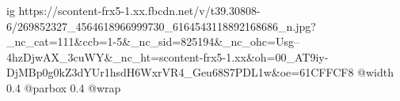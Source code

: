  
 
 
 
 

\ifcmt
  ig https://scontent-frx5-1.xx.fbcdn.net/v/t39.30808-6/269852327_4564618966999730_6164543118892168686_n.jpg?_nc_cat=111&ccb=1-5&_nc_sid=825194&_nc_ohc=Usg--4hzDjwAX_3cuWY&_nc_ht=scontent-frx5-1.xx&oh=00_AT9iy-DjMBp0g0kZ3dYUr1hsdH6WxrVR4_Geu68S7PDL1w&oe=61CFFCF8
  @width 0.4
  @parbox 0.4
  @wrap \parpic[r]
\fi
